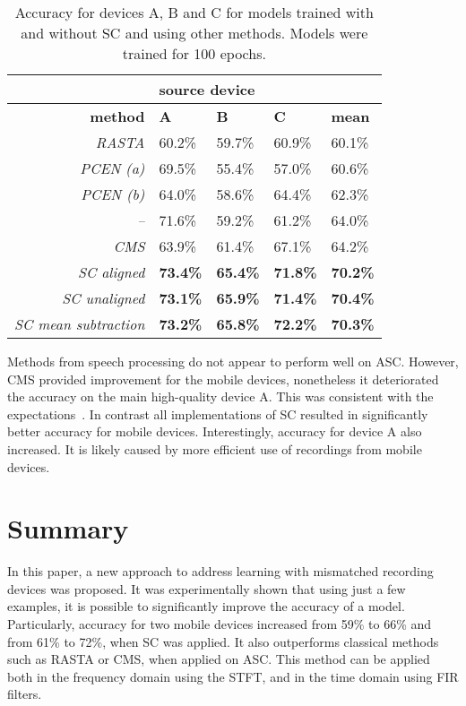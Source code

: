 \documentclass[a4paper]{article}
\begin{document}
\begin{table}[thb]
\centering
\caption{Accuracy for devices A, B and C for models trained with and without SC and using other methods. Models were trained for 100 epochs.}
\begin{tabular}{@{}rllll@{}}
\toprule
                             & \multicolumn{4}{l}{\textbf{source device}}               \\ \midrule
\textbf{method}              & \textbf{A}          & \textbf{B}      & \textbf{C} & \textbf{mean}       \\ \midrule
\textit{RASTA}               & 60.2\% & 59.7\% & 60.9\% & 60.1\%    \\
\textit{PCEN (a)}            & 69.5\% & 55.4\% & 57.0\% & 60.6\%    \\
\textit{PCEN (b)}            & 64.0\% & 58.6\% & 64.4\% & 62.3\%    \\
\textit{--}                  & 71.6\% & 59.2\% & 61.2\% & 64.0\%    \\
\textit{CMS}                 & 63.9\% & 61.4\% & 67.1\% & 64.2\%    \\
\textit{SC aligned}          & \textbf{73.4\%} & \textbf{65.4\%} & \textbf{71.8\%} & \textbf{70.2\%}    \\
\textit{SC unaligned}        & \textbf{73.1\%} & \textbf{65.9\%} & \textbf{71.4\%} & \textbf{70.4\%}    \\
\textit{SC mean subtraction} & \textbf{73.2\%} & \textbf{65.8\%} & \textbf{72.2\%} & \textbf{70.3\%}    \\
\bottomrule
\end{tabular}
\label{tab:with-n-without}
\end{table}

Methods from speech processing do not appear to perform well on ASC.
However, CMS provided improvement for the mobile devices, nonetheless it deteriorated the accuracy on the main high-quality device A. This was consistent with the expectations~\cite{mammoneRobustSpeakerRecognition1996}. In contrast all implementations of SC resulted in significantly better accuracy for mobile devices. Interestingly, accuracy for device A also increased. It is likely caused by more efficient use of recordings from mobile devices.

\section{Summary}
\label{sec:summary}

In this paper, a new approach to address learning with mismatched recording devices was proposed. It was experimentally shown that using just a few examples, it is possible to significantly improve the accuracy of a model. Particularly, accuracy for two mobile devices increased from 59\% to 66\% and from 61\% to 72\%, when SC was applied. It also outperforms classical methods such as RASTA or CMS, when applied on ASC. 
This method can be applied both in the frequency domain using the STFT, and in the time domain using FIR filters. 
\end{document}
